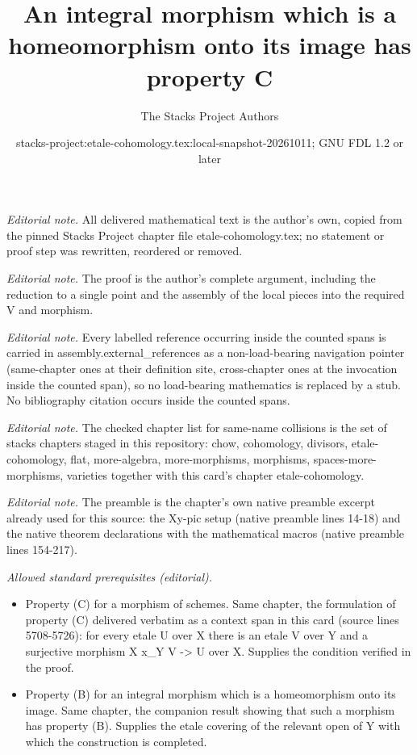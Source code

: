 \documentclass[10pt,a4paper]{amsart}
\title{An integral morphism which is a homeomorphism onto its image has property C}
\author{The Stacks Project Authors}
\date{stacks-project:etale-cohomology.tex:local-snapshot-20261011; GNU FDL 1.2 or later}
\theoremstyle{plain}
\theoremstyle{definition}
\theoremstyle{remark}
\numberwithin{equation}{subsection}
\begin{document}
\maketitle
\noindent\textit{Editorial note.} All delivered mathematical text is the author's own, copied from the pinned Stacks Project chapter file etale-cohomology.tex; no statement or proof step was rewritten, reordered or removed.\par\medskip
\noindent\textit{Editorial note.} The proof is the author's complete argument, including the reduction to a single point and the assembly of the local pieces into the required V and morphism.\par\medskip
\noindent\textit{Editorial note.} Every labelled reference occurring inside the counted spans is carried in assembly.external\_references as a non-load-bearing navigation pointer (same-chapter ones at their definition site, cross-chapter ones at the invocation inside the counted span), so no load-bearing mathematics is replaced by a stub. No bibliography citation occurs inside the counted spans.\par\medskip
\noindent\textit{Editorial note.} The checked chapter list for same-name collisions is the set of stacks chapters staged in this repository: chow, cohomology, divisors, etale-cohomology, flat, more-algebra, more-morphisms, morphisms, spaces-more-morphisms, varieties together with this card's chapter etale-cohomology.\par\medskip
\noindent\textit{Editorial note.} The preamble is the chapter's own native preamble excerpt already used for this source: the Xy-pic setup (native preamble lines 14-18) and the native theorem declarations with the mathematical macros (native preamble lines 154-217).\par\medskip
\noindent\textit{Allowed standard prerequisites (editorial).}\begin{itemize}
\item Property (C) for a morphism of schemes. Same chapter, the formulation of property (C) delivered verbatim as a context span in this card (source lines 5708-5726): for every etale U over X there is an etale V over Y and a surjective morphism X x\_Y V -> U over X. Supplies the condition verified in the proof.
\item Property (B) for an integral morphism which is a homeomorphism onto its image. Same chapter, the companion result showing that such a morphism has property (B). Supplies the etale covering of the relevant open of Y with which the construction is completed.
\end{itemize}\medskip
\end{document}

